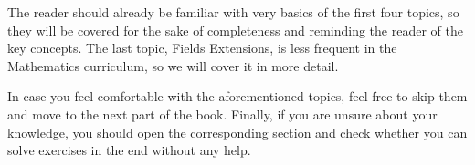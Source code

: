 \documentclass[../../lecture-notes-148x210.tex]{subfiles}
\begin{document}
The reader should already be familiar with very basics of the first four topics,
so they will be covered for the sake of completeness and reminding the reader of
the key concepts. The last topic, Fields Extensions, is less frequent in 
the Mathematics curriculum, so we will cover it in more detail.

In case you feel comfortable with the aforementioned topics, feel free to skip 
them and move to the next part of the book. Finally, if you are unsure about 
your knowledge, you should open the corresponding section and check whether 
you can solve exercises in the end without any help.
\end{document}
